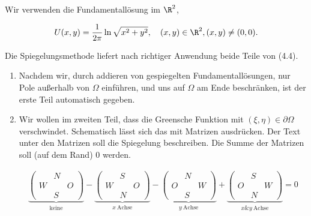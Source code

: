 \begin{solution}

\phantom{}



Wir verwenden die Fundamentallösung im $\R^2$,

\begin{align*}
  U(x, y)
  =
  \frac{1}{2 \pi}
  \ln \sqrt{x^2 + y^2},
  \quad
  (x, y) \in \R^2,
  (x, y) \neq (0, 0).
\end{align*}

Die Spiegelungsmethode liefert nach richtiger Anwendung beide Teile von (4.4).

\begin{enumerate}

  \item Nachdem wir, durch addieren von gespiegelten Fundamentallösungen, nur Pole außerhalb von $\Omega$ einführen, und uns auf $\Omega$ am Ende beschränken, ist der erste Teil automatisch gegeben.

  \item Wir wollen im zweiten Teil, dass die Greensche Funktion mit $(\xi, \eta) \in \partial \Omega$ verschwindet.
  Schematisch lässt sich das mit Matrizen ausdrücken.
  Der Text unter den Matrizen soll die Spiegelung beschreiben.
  Die Summe der Matrizen soll (auf dem Rand) $0$ werden.

  \begin{align*}
    \underbrace
    {
      \begin{pmatrix}
          & N &   \\
        W &   & O \\
          & S &
      \end{pmatrix}
    }_{
      \text{keine}
    }
    -
    \underbrace
    {
      \begin{pmatrix}
          & S &   \\
        W &   & O \\
          & N &
      \end{pmatrix}
    }_{
      x ~\text{Achse}
    }
    -
    \underbrace
    {
      \begin{pmatrix}
          & N &   \\
        O &   & W \\
          & S &
      \end{pmatrix}
    }_{
      y ~\text{Achse}
    }
    +
    \underbrace
    {
      \begin{pmatrix}
          & S &   \\
        O &   & W \\
          & N &
      \end{pmatrix}
    }_{
      x \& y ~\text{Achse}
    }
    =
    0
  \end{align*}


\end{enumerate}
\end{solution}
